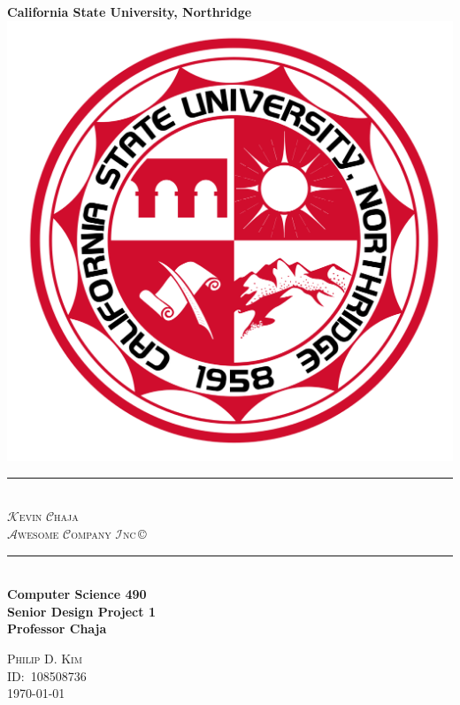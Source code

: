\begin{titlepage}
  \newcommand{\HRule}{\rule{\linewidth}{0.5mm}}
  \center\Huge\textbf{California State University, Northridge}\\[2cm]
  \includegraphics[scale=0.2]{CSUNS.svg.png}\\[1cm]
  \HRule\  \\[0.4cm]
  {\huge\textsc{\(\mathcal{K}\)evin \(\mathcal{C}\)haja\\ \(\mathcal{A}\)wesome \(\mathcal{C}\)ompany \(\mathcal{I}\)nc}\,\footnotesize\copyright}\\[0.4cm]
  \HRule\  \\[1.4cm]
  \Large\textbf{Computer Science 490\\Senior Design Project 1}\\[0.5cm]
  \large\textbf{Professor Chaja}
  \vfill
  \begin{minipage}{0.4\textwidth}
  \large\centering\textsc{Philip D. Kim}\\
  \textsc{ID:\ 108508736}\\
  \textsc{\today}
  \end{minipage}
\end{titlepage}